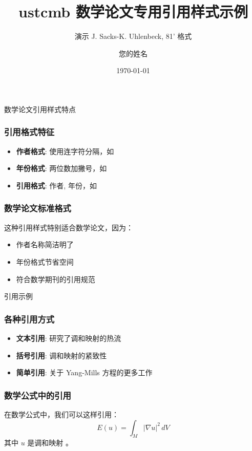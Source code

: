 \documentclass[biblatex,citemath,zh]{ustcmb}
\title[数学论文引用样式示例]{ustcmb 数学论文专用引用样式示例}
\subtitle{演示 J. Sacks-K. Uhlenbeck, 81' 格式}
\author[作者]{您的姓名}
\institute[机构]{您的机构}
\date{\today}
\begin{document}
\frame{\titlepage}

\begin{frame}{数学论文引用样式特点}
  \frametitle{引用格式特征}
  
  \begin{itemize}
    \item \textbf{作者格式}: 使用连字符分隔，如 \textcite{SibnerSibnerUhlenbeck1989Solutions}
    \item \textbf{年份格式}: 两位数加撇号，如 \parencite{AtiyahBott1983Yang}
    \item \textbf{引用格式}: 作者, 年份，如 \cite{SibnerSibnerUhlenbeck1989Solutions}
  \end{itemize}
  
  \vspace{1em}
  
  \frametitle{数学论文标准格式}
  
  这种引用样式特别适合数学论文，因为：
  \begin{itemize}
    \item 作者名称简洁明了
    \item 年份格式节省空间
    \item 符合数学期刊的引用规范
  \end{itemize}
\end{frame}

\begin{frame}{引用示例}
  \frametitle{各种引用方式}
  
  \begin{itemize}
    \item \textbf{文本引用}: \textcite{SibnerSibnerUhlenbeck1989Solutions} 研究了调和映射的热流
    \item \textbf{括号引用}: 调和映射的紧致性 \parencite{AtiyahBott1983Yang}
    \item \textbf{简单引用}: 关于 Yang-Mills 方程的更多工作 \cite{SibnerSibnerUhlenbeck1989Solutions}
  \end{itemize}
  
  \vspace{1em}
  
  \frametitle{数学公式中的引用}
  
  在数学公式中，我们可以这样引用：
  \[
    E(u) = \int_M |\nabla u|^2 \, dV
  \]
  其中 $u$ 是调和映射 \parencite{EellsSampson1964Harmonic}。
\end{frame}
\end{document}
